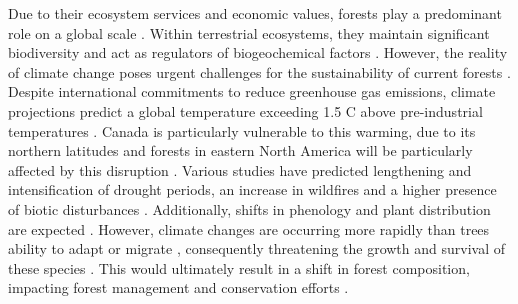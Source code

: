 Due to their ecosystem services and economic values, forests play a predominant role on a global scale \citep{Balvanera2006Quantifyingevidence}. 
Within terrestrial ecosystems, they maintain significant biodiversity and act as regulators of biogeochemical factors \citep{Pawson2013Plantationforests}. 
However, the reality of climate change poses urgent challenges for the sustainability of current forests \citep{McKenney2009Climatechange,Messier2022Warningnatural,Seidl2017Forestdisturbances,Trumbore2015Foresthealth}. 
Despite international commitments to reduce greenhouse gas emissions, climate projections predict a global temperature exceeding 1.5 C above pre-industrial temperatures \citep{Matthews2022Currentglobal}. 
Canada is particularly vulnerable to this warming, due to its northern latitudes \citep{Alo2008Potentialfuture,Bush2019Canadachanging} and forests in eastern North America will be particularly affected by this disruption \citep{Park2014Canboreal,Mahony2017closerlook,Messier2022Warningnatural,Sittaro2017Treerange}. 
Various studies have predicted lengthening and intensification of drought periods, an increase in wildfires and a higher presence of biotic disturbances \citep{Gatti2021Amazoniacarbon,Heidari2021Effectsclimate,Joyce2013Climatechange,Parmesan2007Influencesspecies}. 
Additionally, shifts in phenology and plant distribution are expected \citep{Aitken2008Adaptationmigration,Chuine2010Whydoes,Gray2013Trackingsuitable,Zhu2012Failuremigrate}. 
However, climate changes are occurring more rapidly than trees ability to adapt or migrate \citep{Aitken2008Adaptationmigration,Harrison2020Plantcommunity,Loarie2009velocityclimate,Messier2022Warningnatural,Williams2013Preparingclimate,Vitt2010Assistedmigration}, 
consequently threatening the growth and survival of these species \citep{Sittaro2017Treerange,Woodall2018Decadalchanges,Zhu2012Failuremigrate}.
This would ultimately result in a shift in forest composition, impacting forest management and conservation efforts \citep{Chmura2011Forestresponses,Lo2011Linkingclimate,McKenney2009Climatechange}.

